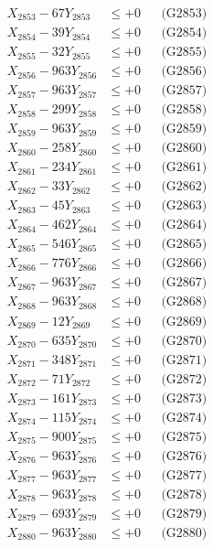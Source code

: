 \documentclass[a4paper,10pt]{article}
\begin{document}
{\begin{align}
X_{2853} - 67Y_{2853} &\leq +0 && \text{(G2853)} \\
X_{2854} - 39Y_{2854} &\leq +0 && \text{(G2854)} \\
X_{2855} - 32Y_{2855} &\leq +0 && \text{(G2855)} \\
X_{2856} - 963Y_{2856} &\leq +0 && \text{(G2856)} \\
X_{2857} - 963Y_{2857} &\leq +0 && \text{(G2857)} \\
X_{2858} - 299Y_{2858} &\leq +0 && \text{(G2858)} \\
X_{2859} - 963Y_{2859} &\leq +0 && \text{(G2859)} \\
X_{2860} - 258Y_{2860} &\leq +0 && \text{(G2860)} \\
\allowbreak
X_{2861} - 234Y_{2861} &\leq +0 && \text{(G2861)} \\
X_{2862} - 33Y_{2862} &\leq +0 && \text{(G2862)} \\
X_{2863} - 45Y_{2863} &\leq +0 && \text{(G2863)} \\
X_{2864} - 462Y_{2864} &\leq +0 && \text{(G2864)} \\
X_{2865} - 546Y_{2865} &\leq +0 && \text{(G2865)} \\
X_{2866} - 776Y_{2866} &\leq +0 && \text{(G2866)} \\
X_{2867} - 963Y_{2867} &\leq +0 && \text{(G2867)} \\
X_{2868} - 963Y_{2868} &\leq +0 && \text{(G2868)} \\
X_{2869} - 12Y_{2869} &\leq +0 && \text{(G2869)} \\
X_{2870} - 635Y_{2870} &\leq +0 && \text{(G2870)} \\
\allowbreak
X_{2871} - 348Y_{2871} &\leq +0 && \text{(G2871)} \\
X_{2872} - 71Y_{2872} &\leq +0 && \text{(G2872)} \\
X_{2873} - 161Y_{2873} &\leq +0 && \text{(G2873)} \\
X_{2874} - 115Y_{2874} &\leq +0 && \text{(G2874)} \\
X_{2875} - 900Y_{2875} &\leq +0 && \text{(G2875)} \\
X_{2876} - 963Y_{2876} &\leq +0 && \text{(G2876)} \\
X_{2877} - 963Y_{2877} &\leq +0 && \text{(G2877)} \\
X_{2878} - 963Y_{2878} &\leq +0 && \text{(G2878)} \\
X_{2879} - 693Y_{2879} &\leq +0 && \text{(G2879)} \\
X_{2880} - 963Y_{2880} &\leq +0 && \text{(G2880)} \\

\end{align}}
\end{document}
